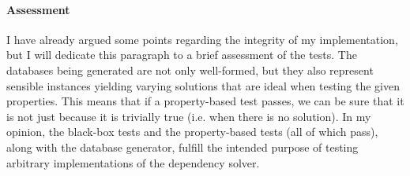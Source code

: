 \paragraph{Assessment}
I have already argued some points regarding the integrity of my implementation, but I will dedicate this paragraph to a brief assessment of the tests. The databases being generated are not only well-formed, but they also represent sensible instances yielding varying solutions that are ideal when testing the given properties. This means that if a property-based test passes, we can be sure that it is not just because it is trivially true (i.e. when there is no solution). In my opinion, the black-box tests and the property-based tests (all of which pass), along with the database generator, fulfill the intended purpose of testing arbitrary implementations of the dependency solver.
